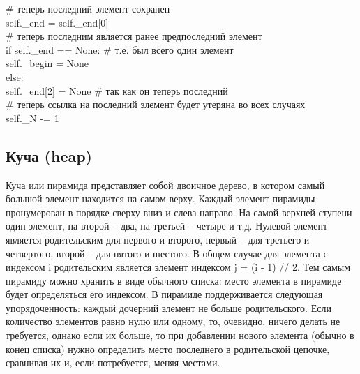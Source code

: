 {\begin{tabbing}
		\> \> \> \# теперь последний элемент сохранен\\
		\> \> self.\_end = self.\_end[0]\\
		\> \> \> \# теперь последним является ранее предпоследний элемент\\
		\> \> if self.\_end == None: \> \> \# т.е. был всего один элемент\\ 
		\> \> \> self.\_begin = None\\
		\> \> else:\\
		\> \> \> self.\_end[2] = None \> \# так как он теперь последний\\
		\> \> \> \# теперь ссылка на последний элемент будет утеряна во всех случаях\\
		\> \> self.\_N -= 1
	\end{tabbing}
}

\subsection*{Куча (heap)}

Куча или пирамида представляет собой двоичное дерево, в котором самый большой элемент находится на самом верху. Каждый элемент пирамиды пронумерован в порядке сверху вниз и слева направо. На самой верхней ступени один элемент, на второй -- два, на третьей -- четыре и т.д. Нулевой элемент является родительским для первого и второго, первый -- для третьего и четвертого, второй -- для пятого и шестого. В общем случае для элемента с индексом i родительским является элемент  индексом j = (i - 1) // 2. Тем самым пирамиду можно хранить в виде обычного списка: место элемента в пирамиде будет определяться его индексом. В пирамиде поддерживается следующая упорядоченность: каждый дочерний элемент не больше родительского. Если количество элементов равно нулю или одному, то, очевидно, ничего делать не требуется, однако если их больше, то при добавлении нового элемента (обычно в конец списка) нужно определить место последнего в родительской цепочке, сравнивая их и, если потребуется, меняя местами. 

